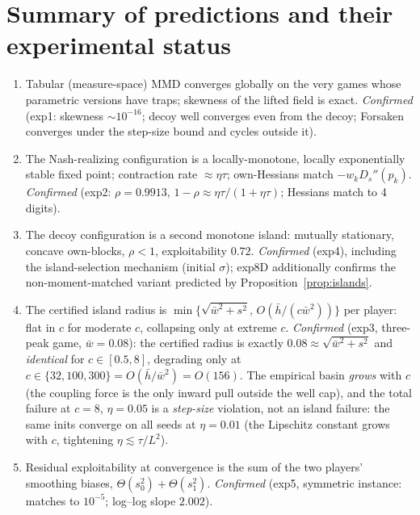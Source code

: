 \documentclass[11pt]{article}
\theoremstyle{definition}
\begin{document}
\section{Summary of predictions and their experimental status}

\begin{enumerate}
\item[P1.] Tabular (measure-space) MMD converges globally on the very games
whose parametric versions have traps; skewness of the lifted field is exact.
\emph{Confirmed} (exp1: skewness $\sim 10^{-16}$; decoy well converges even
from the decoy; Forsaken converges under the step-size bound and cycles
outside it).
\item[P2.] The Nash-realizing configuration is a locally-monotone, locally
exponentially stable fixed point; contraction rate $\approx \eta\tau$;
own-Hessians match $-w_k D_s''(p_k)$. \emph{Confirmed} (exp2: $\rho = 0.9913$,
$1-\rho \approx \eta\tau/(1{+}\eta\tau)$; Hessians match to 4 digits).
\item[P3.] The decoy configuration is a second monotone island: mutually
stationary, concave own-blocks, $\rho < 1$, exploitability $0.72$.
\emph{Confirmed} (exp4), including the island-selection mechanism (initial
$\sigma$); exp8D additionally confirms the non-moment-matched variant
predicted by Proposition~\ref{prop:islands}.
\item[P4.] The certified island radius is $\min\{\sqrt{\bar w^2+s^2},\,
O(\bar h /(c \bar w^2))\}$ per player: flat in $c$ for moderate $c$, collapsing
only at extreme $c$. \emph{Confirmed} (exp3, three-peak game,
$\bar w = 0.08$): the certified radius is exactly $0.08 \approx
\sqrt{\bar w^2+s^2}$ and \emph{identical} for $c \in [0.5, 8]$, degrading only
at $c \in \{32, 100, 300\} = O(\bar h/\bar w^2) = O(156)$. The empirical basin
\emph{grows} with $c$ (the coupling force is the only inward pull outside the
well cap), and the total failure at $c = 8$, $\eta = 0.05$ is a \emph{step-size}
violation, not an island failure: the same inits converge on all seeds at
$\eta = 0.01$ (the Lipschitz constant grows with $c$, tightening
$\eta \lesssim \tau/L^2$).
\item[P5.] Residual exploitability at convergence is the sum of the two
players' smoothing biases, $\Theta(s_0^2) + \Theta(s_1^2)$. \emph{Confirmed}
(exp5, symmetric instance: matches to $10^{-5}$; log--log slope $2.002$).
\end{enumerate}
\end{document}

